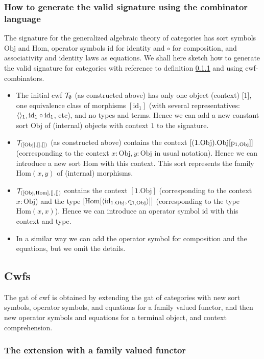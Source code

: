 \documentclass{lmcs}
\def\Obj{\mathrm{Obj}}
\def\Hom{\mathrm{Hom}}
\def\id{\mathrm{id}}
\begin{document}
\subsubsection{How to generate the valid signature using the combinator language} 
The signature for the generalized algebraic theory of categories has sort symbols $\Obj$ 
and $\Hom$, operator symbols $\id$ for identity and $\circ$ for composition, and associativity and identity laws as equations. We shall here sketch how to generate the valid signature for categories with reference to definition \ref{} and using cwf-combinators.
\begin{itemize}
\item The initial cwf ${\mathcal T}_\emptyset$ (as constructed above) has only one object (context) [1], one equivalence class of morphisms $[\id_1]$ (with several representatives: $\tuple{}_1, \id_1 \circ \id_1$, etc), and no types and terms. Hence we can add a new constant sort $\Obj$ of (internal) objects with context $1$ to the signature. 
\item $\T_{([\Obj],[],[])}$ (as constructed above) contains the context $[(1.\Obj).\Obj[\p_{1,\Obj}]]$ (corresponding to the context $x : \Obj, y : \Obj$ in usual notation). Hence we can introduce a new sort $\Hom$ with this context. This sort represents the family $\Hom(x,y)$ of (internal) morphisms.
\item $\T_{([\Obj, \Hom],[],[])}$ contains the context $[1.\Obj]$ (corresponding to the context $x : \Obj$) and the type $[\Hom[\tuple{\id_{1.\Obj},\q_{1,\Obj}}]]$ (corresponding to the type $\Hom(x,x)$). Hence we can introduce an operator symbol $\id$ with this context and type.
\item In a similar way we can add the operator symbol for composition and the equations, but we omit the details.
\end{itemize}

\subsection{Cwfs}

The gat of cwf is obtained by extending the gat of categories with new sort symbols, operator symbols, and equations for a family valued functor, and then new operator symbols and equations for a terminal object, and context comprehension.

\subsubsection{The extension with a family valued functor}
\end{document}
